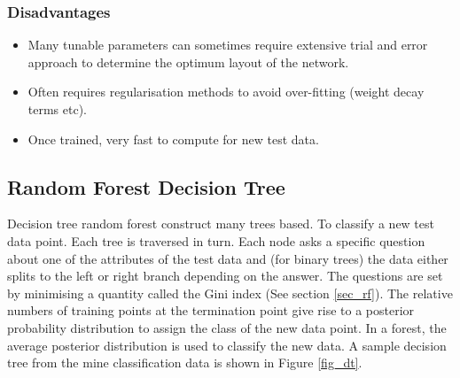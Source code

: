 \documentclass[10pt]{article}
\begin{document}
\subsubsection{Disadvantages}
\begin{itemize} 

\item Many tunable parameters can sometimes require extensive trial and error approach to determine the optimum layout of the network.

\item Often requires regularisation methods to avoid over-fitting (weight decay terms etc).

\item Once trained, very fast to compute for new test data. 

\end{itemize}




\subsection{Random Forest Decision Tree}
Decision tree random forest construct many trees based. To classify a new test data point. Each tree is traversed in turn. Each node asks a specific question about one of the attributes of the test data and (for binary trees) the data either splits to the left or right branch depending on the answer. The questions are set by minimising a quantity called the Gini index (See section \ref{sec_rf}). The relative numbers of training points at the termination point give rise to a posterior probability distribution to assign the class of the new data point. In a forest, the average posterior distribution is used to classify the new data. A sample decision tree from the mine classification data is shown in Figure \ref{fig_dt}.
\end{document}
